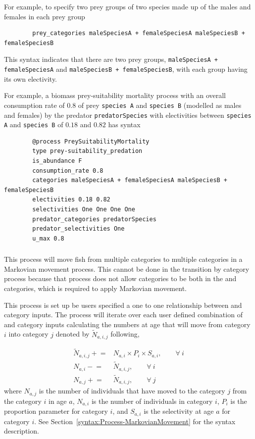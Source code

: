 For example, to specify two prey groups of two species made up of the males and females in each prey group

{\small{\begin{verbatim}
		prey_categories maleSpeciesA + femaleSpeciesA maleSpeciesB + femaleSpeciesB
\end{verbatim}}}

This syntax indicates that there are two prey groups, \texttt{maleSpeciesA + femaleSpeciesA} and \texttt{maleSpeciesB + femaleSpeciesB}, with each group having its own electivity.

For example, a biomass prey-suitability mortality process with an overall consumption rate of $0.8$ of prey \texttt{species A} and \texttt{species B} (modelled as males and females) by the predator \texttt{predatorSpecies} with electivities between \texttt{species A} and \texttt{species B} of $0.18$ and $0.82$ has syntax

{\small{\begin{verbatim}
		@process PreySuitabilityMortality
		type prey-suitability_predation
		is_abundance F
		consumption_rate 0.8
		categories maleSpeciesA + femaleSpeciesA maleSpeciesB + femaleSpeciesB
		electivities 0.18 0.82
		selectivities One One One One
		predator_categories predatorSpecies
		predator_selectivities One
		u_max 0.8
\end{verbatim}}}

\subsubsection{}\label{sec:Process-MarkovianMovement}
This process will move fish from multiple categories to multiple categories in a Markovian movement process. This cannot be done in the transition by category process because that process does not allow categories to be both in the  and  categories, which is required to apply Markovian movement.

This process is set up be users specified a one to one relationship between  and  category inputs. The process will iterate over each user defined combination of  and  category inputs calculating the numbers at age that will move from category \(i\) into category \(j\) denoted by \(\tilde{N}_{a,i,j}\) following,

\begin{align}
	\tilde{N}_{a,i,j} \mathrel{+}=& N_{a,i} \times P_i \times S_{a,i}, \qquad \forall \ i \\
	N_{a,i} \mathrel{-}=& \tilde{N}_{a,i,j}, \qquad \forall \ i \\
	N_{a,j} \mathrel{+}=& \tilde{N}_{a,i,j}, \qquad \forall \ j
\end{align}
where $N_{a,j}$ is the number of individuals that have moved to the  category $j$ from the  category $i$ in age $a$, $N_{a,i}$ is the number of individuals in category $i$, $P_i$ is the proportion parameter for category $i$, and $S_{a,i}$ is the selectivity at age $a$ for category $i$. See Section~\ref{syntax:Process-MarkovianMovement} for the syntax description. 


